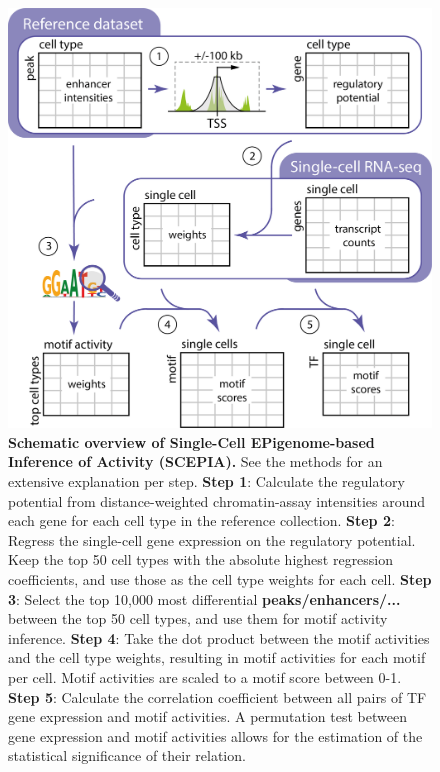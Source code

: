 \begin{figure}
    \centering
    \includegraphics[width=1\linewidth]{ch.scepia/imgs/20231106_OverviewFigure_SvH_v2.png}
    \caption{\textbf{Schematic overview of Single-Cell EPigenome-based Inference of  Activity (SCEPIA).} See the methods for an extensive explanation per step. \newline 
    \textbf{Step 1}: Calculate the regulatory potential from distance-weighted chromatin-assay intensities around each gene for each cell type in the reference collection.
    \textbf{Step 2}: Regress the single-cell gene expression on the regulatory potential. Keep the top 50 cell types with the absolute highest regression coefficients, and use those as the cell type weights for each cell.
    \textbf{Step 3}: Select the top 10,000 most differential \textbf{peaks/enhancers/...} between the top 50 cell types, and use them for motif activity inference.
    \textbf{Step 4}: Take the dot product between the motif activities and the cell type weights, resulting in motif activities for each motif per cell. Motif activities are scaled to a motif score between 0-1. 
    \textbf{Step 5}: Calculate the correlation coefficient between all pairs of TF gene expression and motif activities. A permutation test between gene expression and motif activities allows for the estimation of the statistical significance of their relation.}
    \label{fig:scepia_overview}
\end{figure}

